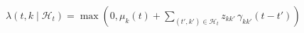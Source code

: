 \documentclass[border=8pt]{standalone}
\begin{document}
{\fontsize{26}{30}\selectfont $\displaystyle \lambda(t,k \mid \mathcal{H}_t)=\max\!\left(0,\mu_k(t)+\sum_{(t',k')\in\mathcal{H}_t} z_{kk'}\,\gamma_{kk'}(t-t')\right)$}
\end{document}
